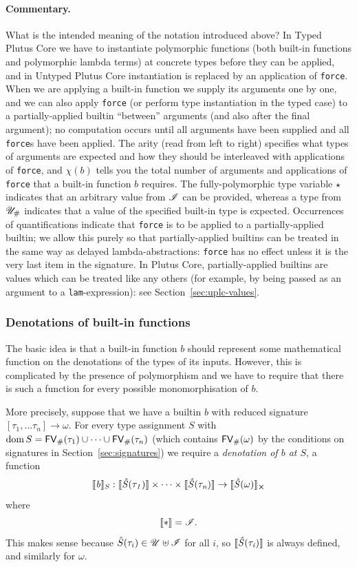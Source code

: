 \paragraph{Commentary.} What is the intended meaning of the notation introduced
above?  In Typed Plutus Core we have to instantiate polymorphic functions (both
built-in functions and polymorphic lambda terms) at concrete types before they
can be applied, and in Untyped Plutus Core instantiation is replaced by an
application of \texttt{force}.  When we are applying a built-in function we
supply its arguments one by one, and we can also apply \texttt{force} (or
perform type instantiation in the typed case) to a partially-applied builtin
``between'' arguments (and also after the final argument); no computation occurs
until all arguments have been supplied and all \texttt{force}s have been
applied. The arity (read from left to right) specifies what types of arguments
are expected and how they should be interleaved with applications of
\texttt{force}, and $\chi(b)$ tells you the total number of arguments and
applications of \texttt{force} that a built-in function $b$ requires. The
fully-polymorphic type variable $\star$ indicates that an arbitrary value from
$\mathscr{I}$ can be provided, whereas a type from ${\mathscr{U}_{\#}}$ indicates that a value
of the specified built-in type is expected. Occurrences of quantifications
indicate that \texttt{force} is to be applied to a partially-applied builtin; we
allow this purely so that partially-applied builtins can be treated in the same
way as delayed lambda-abstractions: \texttt{force} has no effect unless it is
the very last item in the signature.  In Plutus Core, partially-applied
builtins are values which can be treated like any others (for example, by being
passed as an argument to a \texttt{lam}-expression): see
Section~\ref{sec:uplc-values}.

\subsubsection{Denotations of built-in functions}
\label{sec:builtin-denotations}
The basic idea is that a built-in function $b$ should represent some
mathematical function on the denotations of the types of its inputs.  However,
this is complicated by the presence of polymorphism and we have to require that
there is such a function for every possible monomorphisation of $b$.

More precisely, suppose that we have a builtin $b$ with reduced signature
$[\tau_1, \ldots \tau_n] \rightarrow \omega$.  For every type assignment $S$ with
$\operatorname{dom} S = \mathsf{FV}_{\#}(\tau_1) \cup \cdots \cup \mathsf{FV}_{\#}(\tau_n)$ (which contains $\mathsf{FV}_{\#}(\omega)$ by
the conditions on signatures in Section~\ref{sec:signatures}) we require a
\textit{denotation of $b$ at $S$}, a function
$$
\denote{b}_S: \denote{\Sext(\tau_1)} \times \cdots \times \denote{\Sext(\tau_n)} \rightarrow \withError{\denote{\Sext(\omega)}}
$$%
\noindent where
$$
\denote{\star} = \Inputs.
$$
\noindent This makes sense because $\hat{S}(\tau_i) \in \mathscr{U} \uplus
\mathscr{I}$ for all $i$, so $\llbracket\mathit{\hat{S}(\tau_i)}\rrbracket$ is always defined,
and similarly for $\omega$.

